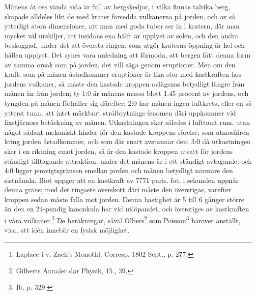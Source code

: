 \documentclass[a4paper, 12pt, oneside, swedish]{article}
\begin{document}
Månens åt oss vända sida är full av bergskedjor, i vilka finnas talrika berg, skapade alldeles likt de med krater försedda vulkanerna på jorden, och av så ytterligt stora dimensioner, att man med goda tuber ser in i kratern, där man mycket väl urskiljer, att insidans ena hälft är upplyst av solen, och den andra beskuggad, under det att översta ringen, som utgör kraterns öppning är hel och hållen upplyst. Det synes vara anledning att förmoda, att bergen fått denna form av samma orsak som på jorden, det vill säga genom eruptioner. Men om den kraft, som på månen åstadkommer eruptioner är lika stor med kastkraften hos jordens vulkaner, så måste den kastade kroppen avlägsnas betydligt längre från månen än från jorden; ty 1:0 är månens massa blott 1.45 procent av jordens, och tyngden på månen förhåller sig därefter; 2:0 har månen ingen luftkrets, eller en så ytterst tunn, att intet märkbart strålbrytnings-fenomen däri uppkommer vid fixstjärnors betäckning av månen. Utkastningen sker således i lufttomt rum, utan något sådant mekaniskt hinder för den kastade kroppens rörelse, som atmosfären kring jorden åstadkommer, och som där snart avstannar den; 3:0 då utkastningen sker i en riktning emot jorden, så är den kastade kroppen utsatt för jordens ständigt tilltagande attraktion, under det månens är i ett ständigt avtagande; och 4:0 ligger jemvigtsgränsen emellan jorden och månen betydligt närmare den sistnämda. Biot uppger att en kastkraft av 7771 paris. fot. i sekunden uppnår denna gräns; med det ringaste överskott däri måste den överstigas, varefter kroppen sedan måste falla mot jorden. Denna hastighet är 5 till 6 gånger större än den en 24-pundig kanonkula har vid utlöpandet, och överstiges av kastkraften i våra vulkaner.\footnote{Laplace i v. Zach's Monothl. Corresp. 1802 Sept., p. 277.} De beräkningar, såväl Olbers\footnote{Gilberts Annaler där Physik, 15., 39.} som Poisson\footnote{Ib. p. 329.} häröver anställt, visa, att idén innebär en fysisk möjlighet.
\end{document}
